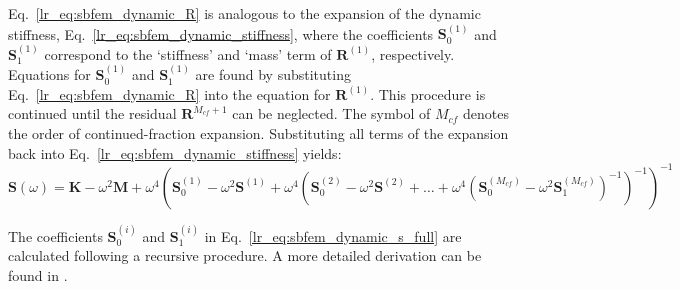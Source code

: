 Eq.~\ref{lr_eq:sbfem_dynamic_R} is analogous to the expansion of the dynamic stiffness, Eq.~\ref{lr_eq:sbfem_dynamic_stiffness}, where the coefficients $\mathbf{S}^{(1)}_0$ and $\mathbf{S}^{(1)}_1$ correspond to the `stiffness' and `mass' term of $\mathbf{R}^{(1)}$, respectively.
Equations for $\mathbf{S}^{(1)}_0$ and $\mathbf{S}^{(1)}_1$ are found by substituting Eq.~\ref{lr_eq:sbfem_dynamic_R} into the equation for $\mathbf{R}^{(1)}$.
This procedure is continued until the residual $\mathbf{R}^{M_{cf}+1}$ can be neglected.
The symbol of $M_{cf}$ denotes the order of continued-fraction expansion.
Substituting all terms of the expansion back into Eq.~\ref{lr_eq:sbfem_dynamic_stiffness} yields:
\begin{dmath}
    \mathbf{S}(\omega) =    \mathbf{K} - \omega^2 \mathbf{M} + \omega^4 \left(
                                \mathbf{S}_0^{(1)} - \omega^2 \mathbf{S}^{(1)} + \omega^4 \left(
                                    \mathbf{S}_0^{(2)} - \omega^2 \mathbf{S}^{(2)} + \dots + 
                                    \omega^4 \left(
                                        \mathbf{S}_0^{(M_{cf})} - \omega^2 \mathbf{S}_1^{(M_{cf})}
                                    \right)^{-1}
                                \right)^{-1}
                            \right)^{-1}
\label{lr_eq:sbfem_dynamic_s_full}
\end{dmath}

The coefficients $\mathbf{S}^{(i)}_0$ and $\mathbf{S}^{(i)}_1$ in Eq.~\ref{lr_eq:sbfem_dynamic_s_full} are calculated following a recursive procedure.
A more detailed derivation can be found in \cite{Song2009}.